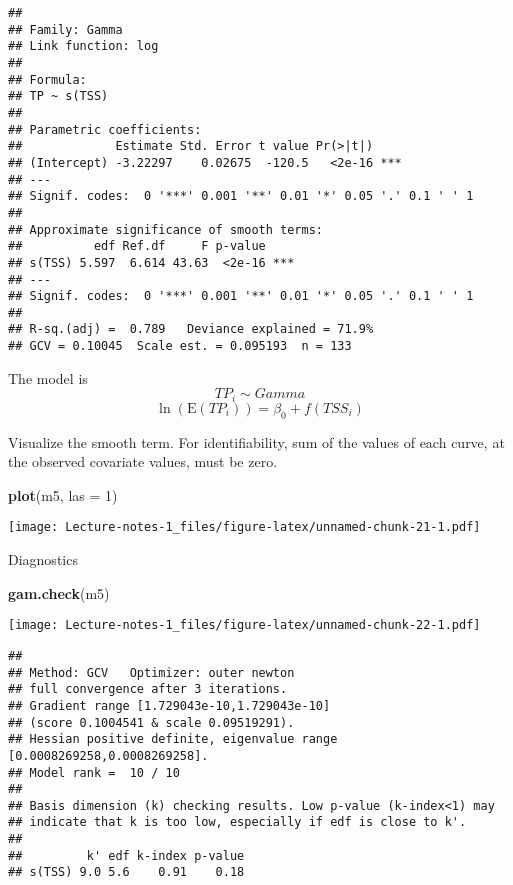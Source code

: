 \documentclass[
]{book}
\newenvironment{Shaded}{\begin{snugshade}}{\end{snugshade}}
\newcommand{\DataTypeTok}[1]{\textcolor[rgb]{0.13,0.29,0.53}{#1}}
\newcommand{\DecValTok}[1]{\textcolor[rgb]{0.00,0.00,0.81}{#1}}
\newcommand{\KeywordTok}[1]{\textcolor[rgb]{0.13,0.29,0.53}{\textbf{#1}}}
\newcommand{\NormalTok}[1]{#1}
\begin{document}
\begin{verbatim}
## 
## Family: Gamma 
## Link function: log 
## 
## Formula:
## TP ~ s(TSS)
## 
## Parametric coefficients:
##             Estimate Std. Error t value Pr(>|t|)    
## (Intercept) -3.22297    0.02675  -120.5   <2e-16 ***
## ---
## Signif. codes:  0 '***' 0.001 '**' 0.01 '*' 0.05 '.' 0.1 ' ' 1
## 
## Approximate significance of smooth terms:
##          edf Ref.df     F p-value    
## s(TSS) 5.597  6.614 43.63  <2e-16 ***
## ---
## Signif. codes:  0 '***' 0.001 '**' 0.01 '*' 0.05 '.' 0.1 ' ' 1
## 
## R-sq.(adj) =  0.789   Deviance explained = 71.9%
## GCV = 0.10045  Scale est. = 0.095193  n = 133
\end{verbatim}

The model is
\[TP_i \sim Gamma\]
\[\ln(\text{E}(TP_i)) = \beta_0 + f(TSS_i)\]

Visualize the smooth term. For identifiability, sum of the values of each curve, at the observed covariate values, must be zero.

\begin{Shaded}
\begin{Highlighting}[]
\KeywordTok{plot}\NormalTok{(m5, }\DataTypeTok{las =} \DecValTok{1}\NormalTok{)}
\end{Highlighting}
\end{Shaded}

\texttt{[image: Lecture-notes-1\_files/figure-latex/unnamed-chunk-21-1.pdf]}

Diagnostics

\begin{Shaded}
\begin{Highlighting}[]
\KeywordTok{gam.check}\NormalTok{(m5)}
\end{Highlighting}
\end{Shaded}

\texttt{[image: Lecture-notes-1\_files/figure-latex/unnamed-chunk-22-1.pdf]}

\begin{verbatim}
## 
## Method: GCV   Optimizer: outer newton
## full convergence after 3 iterations.
## Gradient range [1.729043e-10,1.729043e-10]
## (score 0.1004541 & scale 0.09519291).
## Hessian positive definite, eigenvalue range [0.0008269258,0.0008269258].
## Model rank =  10 / 10 
## 
## Basis dimension (k) checking results. Low p-value (k-index<1) may
## indicate that k is too low, especially if edf is close to k'.
## 
##         k' edf k-index p-value
## s(TSS) 9.0 5.6    0.91    0.18
\end{verbatim}
\end{document}

